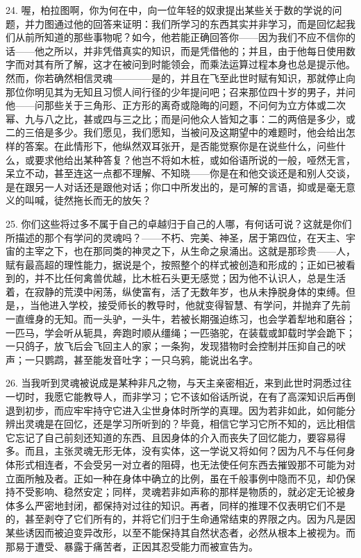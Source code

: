 24. 喔，柏拉图啊，你为何在中，向一位年轻的奴隶提出某些关于数的学说的问题，并力图通过他的回答来证明：我们所学习的东西其实并非学习，而是回忆起我们从前所知道的那些事物呢？如今，他若能正确回答你——因为我们不应不信你的话——他之所以，并非凭借真实的知识，而是凭借他的；并且，由于他每日使用数字而对其有所了解，这才在被问到时能领会，而乘法运算过程本身也总是提示他。然而，你若确然相信灵魂————是的，并且在飞至此世时赋有知识，那就停止向那位你明见其为无知且习惯人间行径的少年提问吧；召来那位四十岁的男子，并问他——问那些关于三角形、正方形的离奇或隐晦的问题，不问何为立方体或二次幂、九与八之比，甚或四与三之比；而是问他众人皆知之事：二的两倍是多少，或二的三倍是多少。我们愿见，我们愿知，当被问及这期望中的难题时，他会给出怎样的答案。在此情形下，他纵然双耳张开，是否能觉察你是在说些什么，问些什么，或要求他给出某种答复？他岂不将如木桩，或如俗语所说的一般，哑然无言，呆立不动，甚至连这一点都不理解、不知晓——你是在和他交谈还是和别人交谈，是在跟另一人对话还是跟他对话；你口中所发出的，是可解的言语，抑或是毫无意义的叫喊，徒然拖长而无的放矢？\par

25. 你们这些将过多不属于自己的卓越归于自己的人哪，有何话可说？这就是你们所描述的那个有学问的灵魂吗？——不朽、完美、神圣，居于第四位，在天主、宇宙的主宰之下，也在那同类的神灵之下，从生命之泉涌出。这就是那珍贵——人，赋有最高超的理性能力，据说是个，按照整个的样式被创造和形成的；正如已被看到的，并不比任何禽兽优越，比木桩石头更无感觉；因为他不认识人，总是生活着，在寂静的荒漠中闲荡，纵使富有，活了无数年岁，也从未挣脱身体的束缚。但是，，当他进入学校，接受师长的教导时，他就变得智慧、有学问，并抛弃了先前一直缠身的无知。而一头驴，一头牛，若被长期强迫练习，也会学着犁地和磨谷；一匹马，学会听从轭具，奔跑时顺从缰绳；一匹骆驼，在装载或卸载时学会跪下；一只鸽子，放飞后会飞回主人的家；一条狗，发现猎物时会控制并压抑自己的吠声；一只鹦鹉，甚至能发音吐字；一只乌鸦，能说出名字。\par

26. 当我听到灵魂被说成是某种非凡之物，与天主亲密相近，来到此世时洞悉过往一切时，我愿它能教导人，而非学习；它不该如俗话所说，在有了高深知识后再倒退到初步，而应牢牢持守它进入尘世身体时所学的真理。因为若非如此，如何能分辨出灵魂是在回忆，还是学习所听到的？毕竟，相信它学习它所不知的，远比相信它忘记了自己前刻还知道的东西、且因身体的介入而丧失了回忆能力，要容易得多。而且，主张灵魂无形无体，没有实体，这一学说又将如何？因为凡不与任何身体形式相连者，不会受另一对立者的阻碍，也无法使任何东西去摧毁那不可能为对立面所触及者。正如一种在身体中确立的比例，虽在千般事例中隐而不见，却仍保持不受影响、稳然安定；同样，灵魂若非如声称的那样是物质的，就必定无论被身体多么严密地封闭，都保持对过往的知识。再者，同样的推理不仅表明它们不是的，甚至剥夺了它们所有的，并将它们归于生命通常结束的界限之内。因为凡是因某些诱因而被迫变异改形，以至不能保持其自然状态者，必然从根本上被视为。而那易于遭受、暴露于痛苦者，正因其忍受能力而被宣告为。\par

